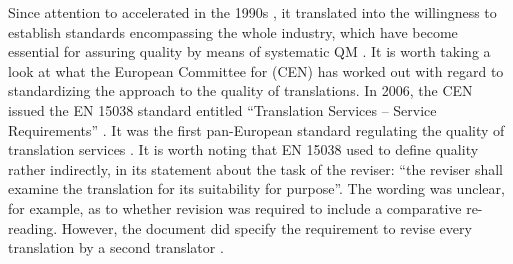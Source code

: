 \documentclass[output=paper]{langsci/langscibook}
\begin{document}
\largerpage[-1] %
Since attention to  accelerated in the 1990s \citep[15]{PrietoRamos2015}, it translated into the willingness to establish standards encompassing the whole industry, which have become essential for assuring quality by means of systematic QM \citep[170]{Lušicky2017}. It is worth taking a look at what the European Committee for  (CEN) has worked out with regard to standardizing the approach to the quality of translations. In 2006, the CEN issued the EN 15038 standard entitled “Translation Services – Service Requirements” \citep[131]{Mossop2014}. It was the first pan-European standard regulating the quality of translation services \citep[16]{Biel2011a}. It is worth noting that EN 15038 used to define quality rather indirectly, in its statement about the task of the reviser: “the reviser shall examine the translation for its suitability for purpose”. The wording was unclear, for example, as to whether revision was required to include a comparative re-reading. However, the document did specify the requirement to revise every translation by a second translator \citep{Biel2011b}.
\end{document}
